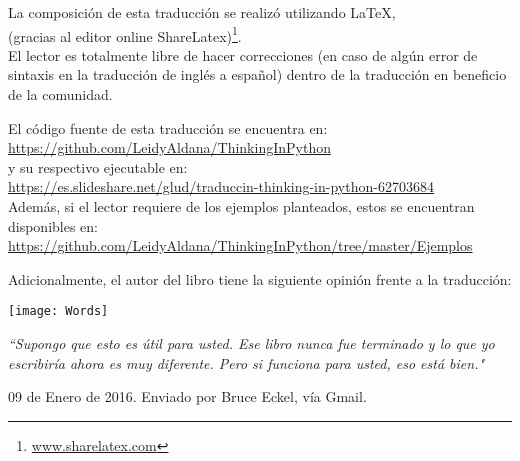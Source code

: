 \newpage
\thispagestyle{empty}


La composición de esta traducción se realizó utilizando \LaTeX, \\(gracias al editor online ShareLatex)\footnote{\url{www.sharelatex.com}}. \\

El lector es totalmente libre de hacer correcciones (en caso de algún error de sintaxis en la traducción de inglés a español) dentro de la traducción en beneficio de la comunidad. \\

\begin{center}

El código fuente de esta traducción se encuentra en: \\
\url{https://github.com/LeidyAldana/ThinkingInPython}  \\
y su respectivo ejecutable en: \\ \url{https://es.slideshare.net/glud/traduccin-thinking-in-python-62703684}\\
\vspace{0.6cm}
Además, si el lector requiere de los ejemplos planteados, estos se encuentran disponibles en:\\ \url{https://github.com/LeidyAldana/ThinkingInPython/tree/master/Ejemplos}\\

\end{center}

\vspace{0.6cm}

Adicionalmente, el autor del libro tiene la siguiente opinión frente a la traducción:

\vspace{0.6cm}

\texttt{[image: Words]}

\vspace{0.6cm}

\textit{ “Supongo que esto es útil para usted. Ese libro nunca fue terminado y lo que yo escribiría ahora es muy diferente. Pero si funciona para usted, eso está bien."  }   

\begin{flushright}

09 de Enero de 2016. Enviado por Bruce Eckel, vía Gmail.
    
\end{flushright}


